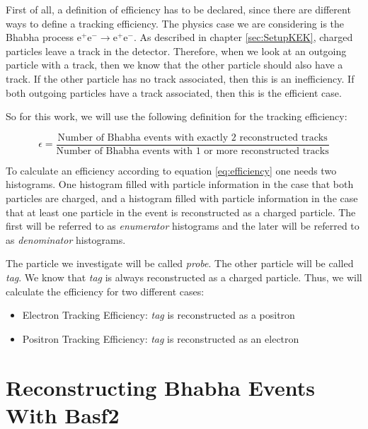 \documentclass[a4paper,11pt,twosided,final,german,openbib,pdftex,listof=totoc,bibliography=totoc]{scrbook}
\begin{document}
First of all, a definition of efficiency has to be declared, since there are different ways to define a tracking efficiency. The physics case we are considering is the Bhabha process $ \textrm{e}^+ \textrm{e}^- \rightarrow \textrm{e}^+ \textrm{e}^- $. As described in chapter \ref{sec:SetupKEK}, charged particles leave a track in the detector. Therefore, when we look at an outgoing particle with a track, then we know that the other particle should also have a track. If the other particle has no track associated, then this is an inefficiency. If both outgoing particles have a track associated, then this is the efficient case.

So for this work, we will use the following definition for the tracking efficiency:

\begin{equation}
	\epsilon = \frac{\textrm{Number of Bhabha events with exactly 2 reconstructed tracks}}{\textrm{Number of Bhabha events with 1 or more reconstructed tracks}}
	\label{eq:efficiency}
\end{equation}


To calculate an efficiency according to equation \ref{eq:efficiency} one needs two histograms. One histogram filled with particle information in the case that both particles are charged, and a histogram filled with particle information in the case that at least one particle in the event is reconstructed as a charged particle. The first will be referred to as \textit{enumerator} histograms and the later will be referred to as \textit{denominator} histograms.


The particle we investigate will be called \textit{probe}. The other particle will be called \textit{tag}. We know that \textit{tag} is always reconstructed as a charged particle. Thus, we will calculate the efficiency for two different cases:

\begin{itemize}
	
	\item Electron Tracking Efficiency: \textit{tag} is reconstructed as a positron
	\item Positron Tracking Efficiency: \textit{tag} is reconstructed as an electron
\end{itemize}

\section{Reconstructing Bhabha Events With Basf2}
\label{sec:RecBasf2}
\end{document}
